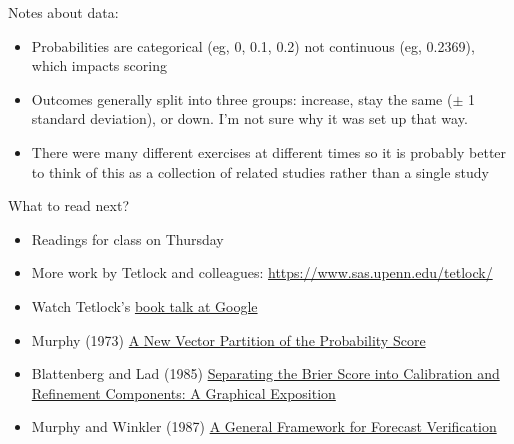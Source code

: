 \documentclass[aspectratio=169]{beamer}
\begin{document}
\begin{frame}

Notes about data:
\begin{itemize}
\item Probabilities are categorical (eg, 0, 0.1, 0.2) not continuous (eg, 0.2369), which impacts scoring
\pause
\item Outcomes generally split into three groups: increase, stay the same ($\pm$ 1 standard deviation), or down.  I'm not sure why it was set up that way.
\pause
\item There were many different exercises at different times so it is probably better to think of this as a collection of related studies rather than a single study
\end{itemize}

\end{frame}
\begin{frame}

What to read next?
\begin{itemize}
\item Readings for class on Thursday
\item More work by Tetlock and colleagues: \url{https://www.sas.upenn.edu/tetlock/}
\item Watch Tetlock's \href{https://www.youtube.com/watch?v=f73A-HB-08M}{book talk at Google}
\item Murphy (1973) \href{https://doi.org/10.1175/1520-0450(1973)012<0595:ANVPOTs>2.0.CO;2}{A New Vector Partition of the Probability Score}
\item Blattenberg and Lad (1985) \href{https://dx.doi.org/10.1080/00031305.1985.10479382}{Separating the Brier Score into Calibration and Refinement Components: A Graphical Exposition}
\item Murphy and Winkler (1987) \href{https://doi.org/10.1175/1520-0493(1987)115\%3C1330:AGFFFV\%3E2.0.CO;2}{A General Framework for Forecast Verification}
\end{itemize}

\end{frame}
\frame{\titlepage}
\end{document}
